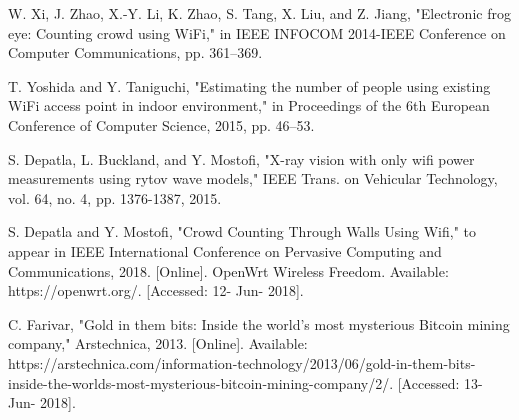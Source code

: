 \documentclass[conference]{IEEEtran}
\begin{document}
\begin{thebibliography}{00}
 W. Xi, J. Zhao, X.-Y. Li, K. Zhao, S. Tang, X. Liu, and Z. Jiang, "Electronic frog eye: Counting crowd using WiFi," in IEEE INFOCOM 2014-IEEE Conference on Computer Communications, pp. 361–369.


 T. Yoshida and Y. Taniguchi, "Estimating the number of people using existing WiFi access point in indoor environment," in Proceedings of the 6th European Conference of Computer Science, 2015, pp. 46–53.

 S. Depatla, L. Buckland, and Y. Mostofi, "X-ray vision with only wifi power measurements using rytov wave models," IEEE Trans. on Vehicular Technology, vol. 64, no. 4, pp. 1376-1387, 2015.

 S. Depatla and Y. Mostofi, "Crowd Counting Through Walls Using Wifi," to appear in IEEE International Conference on Pervasive Computing and Communications, 2018.
 [Online]. OpenWrt Wireless Freedom. Available: https://openwrt.org/. [Accessed: 12- Jun- 2018].

 C. Farivar, "Gold in them bits: Inside the world's most mysterious Bitcoin mining company," Arstechnica, 2013. [Online]. Available: https://arstechnica.com/information-technology/2013/06/gold-in-them-bits-inside-the-worlds-most-mysterious-bitcoin-mining-company/2/. [Accessed: 13- Jun- 2018].

\end{thebibliography}
\end{document}
